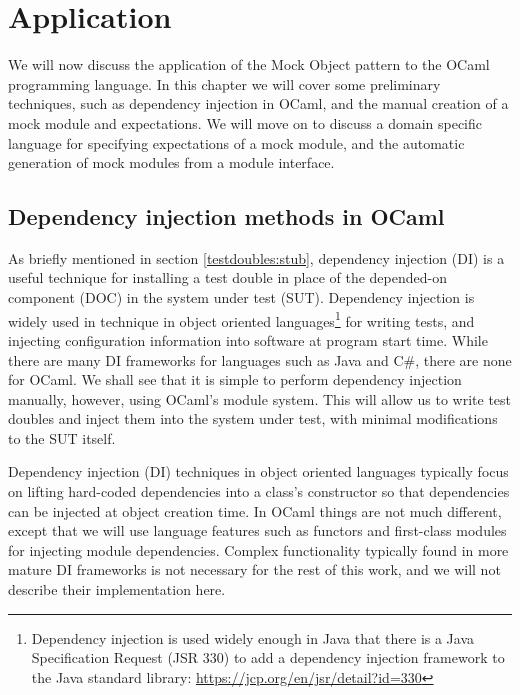 \chapter{Application}
\label{application}

We will now discuss the application of the Mock Object pattern to the
OCaml programming language. In this chapter we will cover some
preliminary techniques, such as dependency injection in OCaml, and the
manual creation of a mock module and expectations. We will move on to
discuss a domain specific language for specifying expectations of a
mock module, and the automatic generation of mock modules from a
module interface.


\section{Dependency injection methods in OCaml}
\label{application:di}

As briefly mentioned in section \ref{testdoubles:stub}, dependency
injection (DI) is a useful technique for installing a test double in
place of the depended-on component (DOC) in the system under test
(SUT). Dependency injection is widely used in technique in object
oriented languages\footnote{Dependency injection is used widely enough
  in Java that there is a Java Specification Request (JSR 330) to add
  a dependency injection framework to the Java standard library:
  \url{https://jcp.org/en/jsr/detail?id=330}} for writing tests, and
injecting configuration information into software at program start
time. While there are many DI frameworks for languages such as Java
and C\#, there are none for OCaml. We shall see that it is simple to
perform dependency injection manually, however, using OCaml's module
system. This will allow us to write test doubles and inject them into
the system under test, with minimal modifications to the SUT itself.

Dependency injection (DI) techniques in object oriented languages
typically focus on lifting hard-coded dependencies into a class's
constructor so that dependencies can be injected at object creation
time. In OCaml things are not much different, except that we will use
language features such as functors and first-class modules for
injecting module dependencies. Complex functionality typically found
in more mature DI frameworks is not necessary for the rest of this
work, and we will not describe their implementation here.

